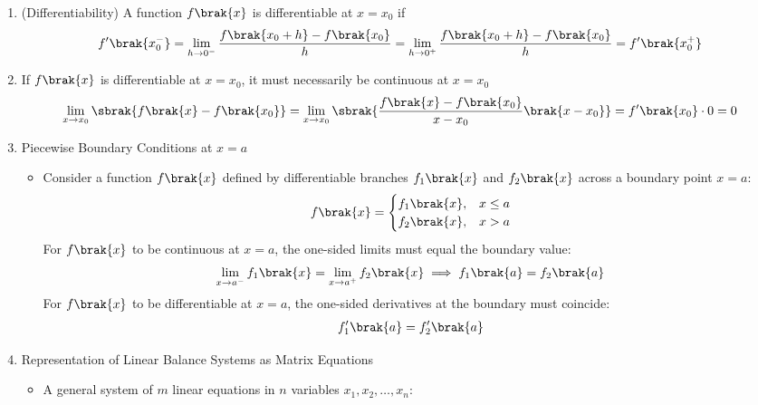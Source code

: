 \begin{enumerate}[label=\thesubsection.\arabic*, ref=\thesubsection.\theenumi,itemsep=0pt]
\begin{align}
\end{align}
\item (Differentiability) 
A function $f\brak{x}$ is differentiable at $x = x_0$ if
\begin{align}
f'\brak{x_0^-} = \lim_{h \to 0^-} \frac{f\brak{x_0 + h} - f\brak{x_0}}{h} = \lim_{h \to 0^+} \frac{f\brak{x_0 + h} - f\brak{x_0}}{h} = f'\brak{x_0^+} 
\label{eq:EE26BTECH11213-deriv_equality}
\end{align}
\item 
If $f\brak{x}$ is differentiable at $x = x_0$, it must necessarily be continuous at $x = x_0$
\begin{align}
\lim_{x \to x_0} \sbrak{f\brak{x} - f\brak{x_0}} = \lim_{x \to x_0} \sbrak{\frac{f\brak{x} - f\brak{x_0}}{x - x_0} \brak{x - x_0}} = f'\brak{x_0} \cdot 0 = 0 \label{eq:EE26BTECH11213-diff_implies_cont}
\end{align}
%
\item Piecewise Boundary Conditions at $x = a$
\begin{itemize}
\item Consider a function $f\brak{x}$ defined by differentiable branches $f_1\brak{x}$ and $f_2\brak{x}$ across a boundary point $x = a$:
\begin{align}
f\brak{x} = \begin{cases}
f_1\brak{x}, & x \le a \\
f_2\brak{x}, & x > a
\end{cases} \label{eq:EE26BTECH11213-piecewise_branches}
\end{align}
For $f\brak{x}$ to be continuous at $x = a$, the one-sided limits must equal the boundary value:
\begin{align}
\lim_{x \to a^-} f_1\brak{x} = \lim_{x \to a^+} f_2\brak{x} \implies f_1\brak{a} = f_2\brak{a} \label{eq:EE26BTECH11213-piecewise_cont_cond}
\end{align}
For $f\brak{x}$ to be differentiable at $x = a$, the one-sided derivatives at the boundary must coincide:
\begin{align}
f_1'\brak{a} = f_2'\brak{a} \label{eq:EE26BTECH11213-piecewise_diff_cond}
\end{align}
\end{itemize}
\iffalse
\item Representation of Linear Balance Systems as Matrix Equations
\begin{itemize}
\item A general system of $m$ linear equations in $n$ variables $x_1, x_2, \dots, x_n$:
\begin{align}

\end{align}
\end{itemize}
\end{enumerate}
